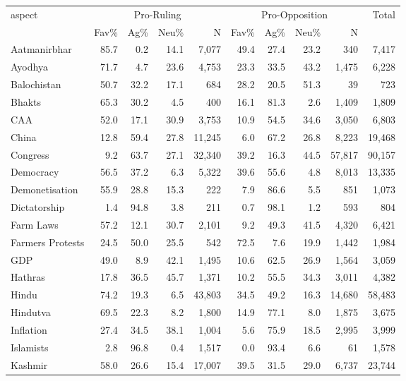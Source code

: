 \begin{table}[htbp]
\centering
\scriptsize
\setlength{\tabcolsep}{4pt}
\begin{tabular}{lrrrrrrrrr}
\toprule
\multirow{2}{*}{aspect} & \multicolumn{4}{c}{Pro-Ruling} & \multicolumn{4}{c}{Pro-Opposition} & \multirow{2}{*}{Total} \\
\cmidrule(lr){2-5}\cmidrule(lr){6-9}
& Fav\% & Ag\% & Neu\% & N & Fav\% & Ag\% & Neu\% & N & \\
\midrule
Aatmanirbhar & 85.7 & 0.2 & 14.1 & 7,077 & 49.4 & 27.4 & 23.2 & 340 & 7,417 \\
Ayodhya & 71.7 & 4.7 & 23.6 & 4,753 & 23.3 & 33.5 & 43.2 & 1,475 & 6,228 \\
Balochistan & 50.7 & 32.2 & 17.1 & 684 & 28.2 & 20.5 & 51.3 & 39 & 723 \\
Bhakts & 65.3 & 30.2 & 4.5 & 400 & 16.1 & 81.3 & 2.6 & 1,409 & 1,809 \\
CAA & 52.0 & 17.1 & 30.9 & 3,753 & 10.9 & 54.5 & 34.6 & 3,050 & 6,803 \\
China & 12.8 & 59.4 & 27.8 & 11,245 & 6.0 & 67.2 & 26.8 & 8,223 & 19,468 \\
Congress & 9.2 & 63.7 & 27.1 & 32,340 & 39.2 & 16.3 & 44.5 & 57,817 & 90,157 \\
Democracy & 56.5 & 37.2 & 6.3 & 5,322 & 39.6 & 55.6 & 4.8 & 8,013 & 13,335 \\
Demonetisation & 55.9 & 28.8 & 15.3 & 222 & 7.9 & 86.6 & 5.5 & 851 & 1,073 \\
Dictatorship & 1.4 & 94.8 & 3.8 & 211 & 0.7 & 98.1 & 1.2 & 593 & 804 \\
Farm Laws & 57.2 & 12.1 & 30.7 & 2,101 & 9.2 & 49.3 & 41.5 & 4,320 & 6,421 \\
Farmers Protests & 24.5 & 50.0 & 25.5 & 542 & 72.5 & 7.6 & 19.9 & 1,442 & 1,984 \\
GDP & 49.0 & 8.9 & 42.1 & 1,495 & 10.6 & 62.5 & 26.9 & 1,564 & 3,059 \\
Hathras & 17.8 & 36.5 & 45.7 & 1,371 & 10.2 & 55.5 & 34.3 & 3,011 & 4,382 \\
Hindu & 74.2 & 19.3 & 6.5 & 43,803 & 34.5 & 49.2 & 16.3 & 14,680 & 58,483 \\
Hindutva & 69.5 & 22.3 & 8.2 & 1,800 & 14.9 & 77.1 & 8.0 & 1,875 & 3,675 \\
Inflation & 27.4 & 34.5 & 38.1 & 1,004 & 5.6 & 75.9 & 18.5 & 2,995 & 3,999 \\
Islamists & 2.8 & 96.8 & 0.4 & 1,517 & 0.0 & 93.4 & 6.6 & 61 & 1,578 \\
Kashmir & 58.0 & 26.6 & 15.4 & 17,007 & 39.5 & 31.5 & 29.0 & 6,737 & 23,744 \\

\end{tabular}
\end{table}
